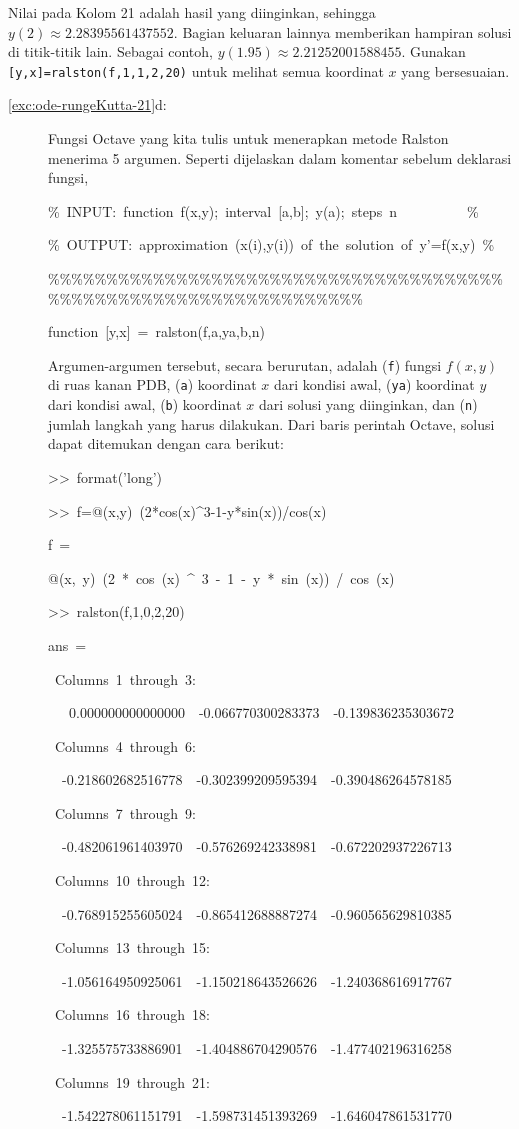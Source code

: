 Nilai pada Kolom 21 adalah hasil yang diinginkan, sehingga $y(2)\approx2.28395561437552$.
Bagian keluaran lainnya memberikan hampiran solusi di titik-titik
lain. Sebagai contoh, $y(1.95)\approx2.21252001588455$. Gunakan \texttt{{[}y,x{]}=ralston(f,1,1,2,20)}
untuk melihat semua koordinat $x$ yang bersesuaian.
\begin{description}
\item [{\ref{exc:ode-rungeKutta-21}d:}] Fungsi Octave yang kita tulis
untuk menerapkan metode Ralston menerima 5 argumen. Seperti dijelaskan
dalam komentar sebelum deklarasi fungsi,

\begin{lyxcode}
\%~INPUT:~function~f(x,y);~interval~{[}a,b{]};~y(a);~steps~n~~~~~~~~~~\%

\%~OUTPUT:~approximation~(x(i),y(i))~of~the~solution~of~y'=f(x,y)~\%

\%\%\%\%\%\%\%\%\%\%\%\%\%\%\%\%\%\%\%\%\%\%\%\%\%\%\%\%\%\%\%\%\%\%\%\%\%\%\%\%\%\%\%\%\%\%\%\%\%\%\%\%\%\%\%\%\%\%\%\%\%\%\%\%\%\%

function~{[}y,x{]}~=~ralston(f,a,ya,b,n)~
\end{lyxcode}
Argumen-argumen tersebut, secara berurutan, adalah (\texttt{f}) fungsi
$f(x,y)$ di ruas kanan PDB, (\texttt{a}) koordinat $x$ dari kondisi
awal, (\texttt{ya}) koordinat $y$ dari kondisi awal, (\texttt{b})
koordinat $x$ dari solusi yang diinginkan, dan (\texttt{n}) jumlah
langkah yang harus dilakukan. Dari baris perintah Octave, solusi dapat
ditemukan dengan cara berikut:
\begin{lyxcode}
>\textcompwordmark >~format('long')

>\textcompwordmark >~f=@(x,y)~(2{*}cos(x)\textasciicircum 3-1-y{*}sin(x))/cos(x)

f~=

@(x,~y)~(2~{*}~cos~(x)~\textasciicircum ~3~-~1~-~y~{*}~sin~(x))~/~cos~(x)

>\textcompwordmark >~ralston(f,1,0,2,20)

ans~=

~Columns~1~through~3:

~~~0.000000000000000~~-0.066770300283373~~-0.139836235303672

~Columns~4~through~6:

~~-0.218602682516778~~-0.302399209595394~~-0.390486264578185

~Columns~7~through~9:

~~-0.482061961403970~~-0.576269242338981~~-0.672202937226713

~Columns~10~through~12:

~~-0.768915255605024~~-0.865412688887274~~-0.960565629810385

~Columns~13~through~15:

~~-1.056164950925061~~-1.150218643526626~~-1.240368616917767

~Columns~16~through~18:

~~-1.325575733886901~~-1.404886704290576~~-1.477402196316258

~Columns~19~through~21:

~~-1.542278061151791~~-1.598731451393269~~-1.646047861531770
\end{lyxcode}
\end{description}
